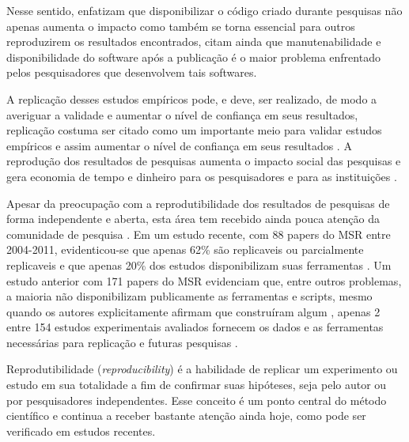 Nesse sentido,  enfatizam que disponibilizar o código
criado durante pesquisas não apenas aumenta o impacto como também se torna
essencial para outros reproduzirem os resultados encontrados, citam ainda que
manutenabilidade e disponibilidade do software após a publicação é o maior
problema enfrentado pelos pesquisadores que desenvolvem tais softwares.

A replicação desses estudos empíricos pode, e deve, ser realizado, de modo a
averiguar a validade e aumentar o nível de confiança em seus resultados,
replicação costuma ser citado como um importante meio para validar estudos
empíricos e assim aumentar o nível de confiança em seus resultados
\cite{Almqvist2006}. A reprodução dos resultados de pesquisas aumenta o impacto
social das pesquisas e gera economia de tempo e dinheiro para os pesquisadores
e para as instituições \cite{Nesta2010}.

Apesar da preocupação com a reprodutibilidade dos resultados de pesquisas de
forma independente \cite{Stodden2009} e aberta, esta área tem recebido ainda
pouca atenção da comunidade de pesquisa \cite{Nancy2015, Grand2010Open}. Em um
estudo recente, com 88 papers do MSR entre 2004-2011, evidenticou-se que apenas
62\% são replicaveis ou parcialmente replicaveis e que apenas 20\% dos estudos
disponibilizam suas ferramentas \cite{amann2015software}. Um estudo anterior
com 171 papers do MSR evidenciam que, entre outros problemas, a maioria não
disponibilizam publicamente as ferramentas e scripts, mesmo quando os autores
explicitamente afirmam que construíram algum \cite{robles2010replicating},
apenas 2 entre 154 estudos experimentais avaliados fornecem os dados e as
ferramentas necessárias para replicação e futuras pesquisas
\cite{barr2010shoulders}.

Reprodutibilidade ({\it reproducibility}) é a habilidade de replicar um experimento
ou estudo em sua totalidade a fim de confirmar suas hipóteses, seja pelo
autor ou por pesquisadores independentes. Esse conceito é um ponto
central do método científico e continua a receber bastante atenção ainda hoje,
como pode ser verificado em estudos recentes.

%

